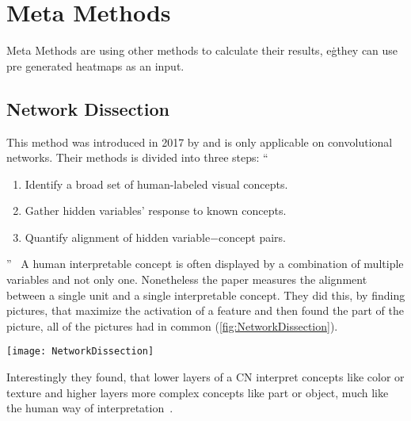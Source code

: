\section{Meta Methods}
Meta Methods are using other methods to calculate their results, e\.g\. they can use pre generated heatmaps as an input.

\subsection{Network Dissection}
This method was introduced in 2017 by  and is only applicable on convolutional networks. Their methods is divided into three steps: 
“
\begin{enumerate}
    \item Identify a broad set of human-labeled visual concepts. 
    \item Gather hidden variables’ response to known concepts.
    \item Quantify alignment of hidden variable−concept pairs.
\end{enumerate}
”~\cite[2]{Bau.2017}
A human interpretable concept is often displayed by a combination of multiple variables and not only one. Nonetheless the paper measures the alignment between a single unit and a single interpretable concept. 
They did this, by finding pictures, that maximize the activation of a feature and then found the part of the picture, all of the pictures had in common (\cref{fig:NetworkDissection}).
\begin{figure*}[ht]
    \center{}
    \texttt{[image: NetworkDissection]}
    \caption{Network Dissection --- feature “lamp”,~\cite{Bau.2017}}\label{fig:NetworkDissection}
\end{figure*}

Interestingly they found, that lower layers of a CN interpret concepts like color or texture and higher layers more complex concepts like part or object, much like the human way of interpretation~\cite{Bau.2017}.

